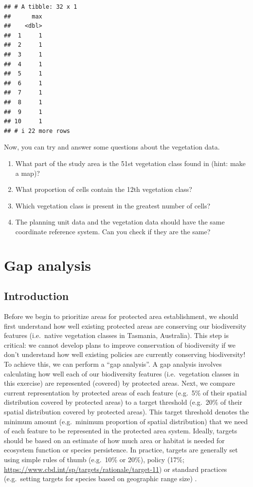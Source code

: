 \documentclass[
  12pt,
]{book}
\makeatletter
\providecommand{\tightlist}{%
  \setlength{\itemsep}{0pt}\setlength{\parskip}{0pt}}
\newenvironment{kframe}{%
\medskip{}
\setlength{\fboxsep}{.8em}
 \def\at@end@of@kframe{}%
 \ifinner\ifhmode%
  \def\at@end@of@kframe{\end{minipage}}%
  \begin{minipage}{\columnwidth}%
 \fi\fi%
 \def\FrameCommand##1{\hskip\@totalleftmargin \hskip-\fboxsep
 \colorbox{shadecolor}{##1}\hskip-\fboxsep
     \hskip-\linewidth \hskip-\@totalleftmargin \hskip\columnwidth}%
 \MakeFramed {\advance\hsize-\width
   \@totalleftmargin\z@ \linewidth\hsize
   \@setminipage}}%
 {\par\unskip\endMakeFramed%
 \at@end@of@kframe}
\newenvironment{rmdblock}[1]
  {
  \begin{itemize}
  \renewcommand{\labelitemi}{
    \raisebox{-.7\height}[0pt][0pt]{
      {\setkeys{Gin}{width=3em,keepaspectratio}\texttt{[image: images/\#1]}}
    }
  }
  \setlength{\fboxsep}{1em}
  \begin{kframe}
  \item
  }
  {
  \end{kframe}
  \end{itemize}
  }
\newenvironment{rmdquestion}
  {\begin{rmdblock}{question}}
  {\end{rmdblock}}
\makeatother
\begin{document}
\begin{verbatim}
## # A tibble: 32 x 1
##      max
##    <dbl>
##  1     1
##  2     1
##  3     1
##  4     1
##  5     1
##  6     1
##  7     1
##  8     1
##  9     1
## 10     1
## # i 22 more rows
\end{verbatim}

Now, you can try and answer some questions about the vegetation data.

\begin{rmdquestion}
\begin{enumerate}
\def\labelenumi{\arabic{enumi}.}
\tightlist
\item
  What part of the study area is the 51st vegetation class found in (hint: make a map)?
\item
  What proportion of cells contain the 12th vegetation class?
\item
  Which vegetation class is present in the greatest number of cells?
\item
  The planning unit data and the vegetation data should have the same coordinate reference system. Can you check if they are the same?
\end{enumerate}
\end{rmdquestion}

\hypertarget{gap-analysis}{%
\chapter{Gap analysis}\label{gap-analysis}}

\hypertarget{introduction-1}{%
\section{Introduction}\label{introduction-1}}

Before we begin to prioritize areas for protected area establishment, we should first understand how well existing protected areas are conserving our biodiversity features (i.e.~native vegetation classes in Tasmania, Australia). This step is critical: we cannot develop plans to improve conservation of biodiversity if we don't understand how well existing policies are currently conserving biodiversity! To achieve this, we can perform a ``gap analysis''. A gap analysis involves calculating how well each of our biodiversity features (i.e.~vegetation classes in this exercise) are represented (covered) by protected areas. Next, we compare current representation by protected areas of each feature (e.g.~5\% of their spatial distribution covered by protected areas) to a target threshold (e.g.~20\% of their spatial distribution covered by protected areas). This target threshold denotes the minimum amount (e.g.~minimum proportion of spatial distribution) that we need of each feature to be represented in the protected area system. Ideally, targets should be based on an estimate of how much area or habitat is needed for ecosystem function or species persistence. In practice, targets are generally set using simple rules of thumb (e.g.~10\% or 20\%), policy (17\%; \url{https://www.cbd.int/sp/targets/rationale/target-11}) or standard practices (e.g.~setting targets for species based on geographic range size) \citep{r1, r2}.
\end{document}
